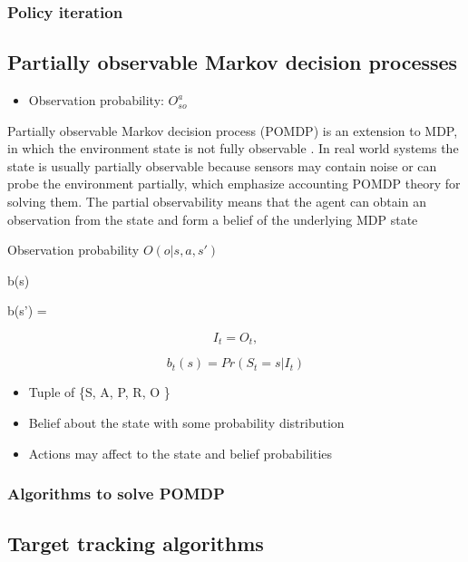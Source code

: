 \documentclass[11pt,a4paper]{article}
\begin{document}
\subsubsection{Policy iteration}


\subsection{Partially observable Markov decision processes}

\begin{itemize}
    \item Observation probability: $O_{so}^a$
\end{itemize}

Partially observable Markov decision process (POMDP) is an extension to MDP, in which the environment state is not fully observable \cite{Krishnamurthy2016}.
In real world systems the state is usually partially observable because sensors may contain noise or can probe the environment partially, which emphasize accounting POMDP theory for solving them.
The partial observability means that the agent can obtain an observation from the state and form a belief of the underlying MDP state

Observation probability $O(o | s, a, s')$

b(s)

b(s') = 

\begin{equation}
    I_t = {O_t, }
\end{equation}

\begin{equation}
    b_t(s) = Pr(S_t=s | I_t)
\end{equation}




\begin{itemize}
    \item Tuple of \{S, A, P, R, O \}
    \item Belief about the state with some probability distribution
    \item Actions may affect to the state and belief probabilities
\end{itemize}

\subsubsection{Algorithms to solve POMDP}


\subsection{Target tracking algorithms}
\end{document}
